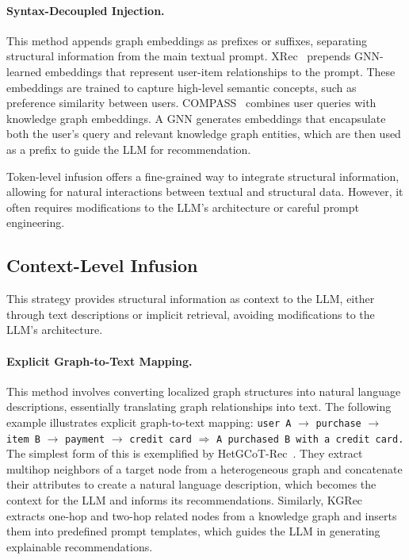 \paragraph{Syntax-Decoupled Injection.}
This method appends graph embeddings as prefixes or suffixes, separating structural information from the main textual prompt. XRec~\cite{ma2024xrec} prepends GNN-learned embeddings that represent user-item relationships to the prompt. These embeddings are trained to capture high-level semantic concepts, such as preference similarity between users. COMPASS~\cite{qiu2024unveiling} combines user queries with knowledge graph embeddings. A GNN generates embeddings that encapsulate both the user's query and relevant knowledge graph entities, which are then used as a prefix to guide the LLM for recommendation.

Token-level infusion offers a fine-grained way to integrate structural information, allowing for natural interactions between textual and structural data. However, it often requires modifications to the LLM's architecture or careful prompt engineering.

\subsection{Context-Level Infusion}

This strategy provides structural information as context to the LLM, either through text descriptions or implicit retrieval, avoiding modifications to the LLM's architecture.

\paragraph{Explicit Graph-to-Text Mapping.} 
This method involves converting localized graph structures into natural language descriptions, essentially translating graph relationships into text. The following example illustrates explicit graph-to-text mapping: \texttt{user A} $\rightarrow$ \texttt{purchase} $\rightarrow$ \texttt{item B} $\rightarrow$ \texttt{payment} $\rightarrow$ \texttt{credit card} $\Rightarrow$ \texttt{A purchased B with a credit card.} The simplest form of this is exemplified by HetGCoT-Rec~\cite{jia2025hetgcot}. They extract multihop neighbors of a target node from a heterogeneous graph and concatenate their attributes to create a natural language description, which becomes the context for the LLM and informs its recommendations. Similarly, KGRec~\cite{abu2024knowledge} extracts one-hop and two-hop related nodes from a knowledge graph and inserts them into predefined prompt templates, which guides the LLM in generating explainable recommendations.


